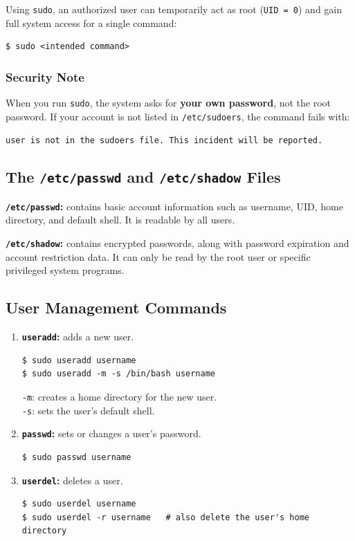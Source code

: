Using \texttt{sudo}, an authorized user can temporarily act as root (\texttt{UID~=~0}) and gain full system access for a single command:
\begin{lstlisting}[language=Terminal]
$ sudo <intended command>
\end{lstlisting}

\subsubsection*{Security Note}
When you run \texttt{sudo}, the system asks for \textbf{your own password}, not the root password. If your account is not listed in \texttt{/etc/sudoers}, the command fails with:
\begin{center}
    \texttt{user is not in the sudoers file. This incident will be reported.}
\end{center}

\subsection{The \texttt{/etc/passwd} and \texttt{/etc/shadow} Files}
\textbf{\texttt{/etc/passwd}:} contains basic account information such as username, UID, home directory, and default shell. It is readable by all users.

\textbf{\texttt{/etc/shadow}:} contains encrypted passwords, along with password expiration and account restriction data. It can only be read by the root user or specific privileged system programs.

\subsection{User Management Commands}
\begin{enumerate}
    \item \textbf{\texttt{useradd}:} adds a new user.
\begin{lstlisting}[language=Terminal]
$ sudo useradd username
$ sudo useradd -m -s /bin/bash username
\end{lstlisting}
    \texttt{-m}: creates a home directory for the new user.\\
    \texttt{-s}: sets the user's default shell.

    \item \textbf{\texttt{passwd}:} sets or changes a user's password.
\begin{lstlisting}[language=Terminal]
$ sudo passwd username
\end{lstlisting}

    \item \textbf{\texttt{userdel}:} deletes a user.
\begin{lstlisting}[language=Terminal]
$ sudo userdel username
$ sudo userdel -r username   # also delete the user's home directory
\end{lstlisting}
\end{enumerate}

